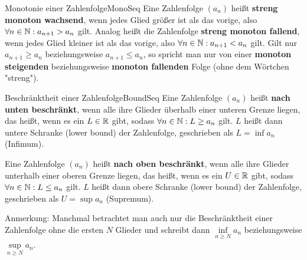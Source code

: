 \begin{definition}{Monotonie einer Zahlenfolge}{MonoSeq}
	Eine Zahlenfolge $(a_n)$ heißt \textbf{streng monoton wachsend}, wenn jedes Glied größer ist als das vorige, also $\forall n \in\mathbb{N}: a_{n+1} > a_n$ gilt. Analog heißt die Zahlenfolge \textbf{streng monoton fallend}, wenn jedes Glied kleiner ist als das vorige, also $\forall n \in\mathbb{N}: a_{n+1} < a_n$ gilt. Gilt nur $a_{n+1} \ge a_n$ beziehungsweise $a_{n+1} \le a_n$, so spricht man nur von einer \textbf{monoton steigenden} beziehungsweise \textbf{monoton fallenden} Folge (ohne dem Wörtchen "streng").
\end{definition}

\begin{definition}{Beschränktheit einer Zahlenfolge}{BoundSeq}
	Eine Zahlenfolge $(a_n)$ heißt \textbf{nach unten beschränkt}, wenn alle ihre Glieder überhalb einer unteren Grenze liegen, das heißt, wenn es ein $L\in\mathbb{R}$ gibt, sodass $\forall n \in\mathbb{N}: L \ge a_n$ gilt. $L$ heißt dann untere Schranke (lower bound) der Zahlenfolge, geschrieben als $L = \inf a_n$ (Infimum).

	Eine Zahlenfolge $(a_n)$ heißt \textbf{nach oben beschränkt}, wenn alle ihre Glieder unterhalb einer oberen Grenze liegen, das heißt, wenn es ein $U\in\mathbb{R}$ gibt, sodass $\forall n \in\mathbb{N}: L \le a_n$ gilt. $L$ heißt dann obere Schranke (lower bound) der Zahlenfolge, geschrieben als $U = \sup a_n$ (Supremum).
\end{definition}

Anmerkung: Manchmal betrachtet man auch nur die Beschränktheit einer Zahlenfolge ohne die ersten $N$ Glieder und schreibt dann $\inf\limits_{n \ge N} a_n$ beziehungsweise $\sup\limits_{n \ge N} a_n$.

